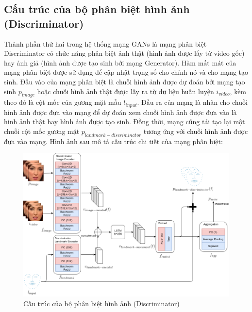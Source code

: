 \subsection{Cấu trúc của bộ phân biệt hình ảnh (Discriminator)}\label{sec:discriminator_detail}

Thành phần thứ hai trong hệ thống mạng GANs là mạng phân biệt Discriminator có chức năng phân biệt ảnh thật (hình ảnh được lấy từ video gốc) hay ảnh giả (hình ảnh được tạo sinh bởi mạng Generator). Hàm mất mát của mạng phân biệt được sử dụng để cập nhật trọng số cho chính nó và cho mạng tạo sinh. Đầu vào của mạng phân biệt là chuỗi hình ảnh được dự đoán bởi mạng tạo sinh $p_{image}$ hoặc chuỗi hình ảnh thật được lấy ra từ dữ liệu huấn luyện $i_{video}$, kèm theo đó là cột mốc của gương mặt mẫu $l_{input}$. Đầu ra của mạng là nhãn cho chuỗi hình ảnh được đưa vào mạng để dự đoán xem chuỗi hình ảnh được đưa vào là hình ảnh thật hay hình ảnh được tạo sinh. Đồng thời, mạng cũng tái tạo lại một chuỗi cột mốc gương mặt $p_{landmark-discriminator}$ tương ứng với chuỗi hình ảnh được đưa vào mạng. Hình ảnh sau mô tả cấu trúc chi tiết của mạng phân biệt:

\begin{figure}[H]
    \centering
    \includegraphics[width=15cm]{./content/materials/discriminator.png}
    \caption{Cấu trúc của bộ phân biệt hình ảnh (Discriminator)}
\end{figure}

